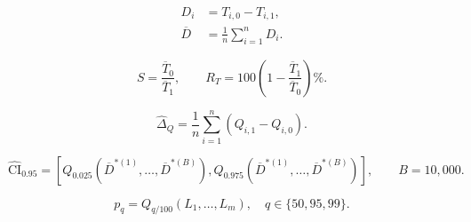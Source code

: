 
\begin{align}
D_i &= T_{i,0} - T_{i,1},
  \label{eq:ss9:paired-saving}\\
\overline{D} &= \frac{1}{n}\sum_{i=1}^{n}D_i.
  \label{eq:ss9:average-saving}
\end{align}

\begin{equation}
S=\frac{\overline{T}_0}{\overline{T}_1},\qquad
R_T=100\left(1-\frac{\overline{T}_1}{\overline{T}_0}\right)\%.
\label{eq:ss9:speedup}
\end{equation}

\begin{equation}
\widehat{\Delta}_Q=\frac{1}{n}\sum_{i=1}^{n}
\left(Q_{i,1}-Q_{i,0}\right).
\label{eq:ss9:quality}
\end{equation}

\begin{equation}
\widehat{\mathrm{CI}}_{0.95}=\left[
  Q_{0.025}\left(\overline{D}^{\ast(1)},\ldots,\overline{D}^{\ast(B)}\right),
  Q_{0.975}\left(\overline{D}^{\ast(1)},\ldots,\overline{D}^{\ast(B)}\right)
\right],\qquad B=10{,}000.
\label{eq:ss9:bootstrap}
\end{equation}

\begin{equation}
p_{q}=Q_{q/100}\!\left(L_1,\ldots,L_m\right),\quad
q\in\{50,95,99\}.
\label{eq:ss9:percentiles}
\end{equation}
